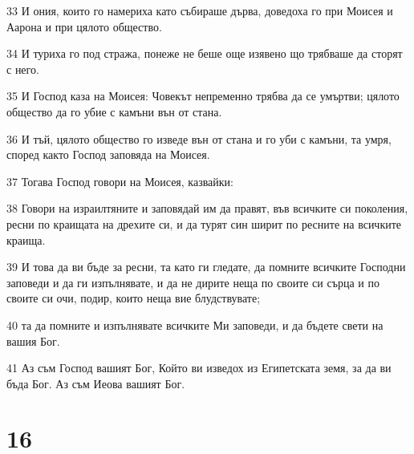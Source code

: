 \par 33 И ония, които го намериха като събираше дърва, доведоха го при Моисея и Аарона и при цялото общество.
\par 34 И туриха го под стража, понеже не беше още изявено що трябваше да сторят с него.
\par 35 И Господ каза на Моисея: Човекът непременно трябва да се умъртви; цялото общество да го убие с камъни вън от стана.
\par 36 И тъй, цялото общество го изведе вън от стана и го уби с камъни, та умря, според както Господ заповяда на Моисея.
\par 37 Тогава Господ говори на Моисея, казвайки:
\par 38 Говори на израилтяните и заповядай им да правят, във всичките си поколения, ресни по краищата на дрехите си, и да турят син ширит по ресните на всичките краища.
\par 39 И това да ви бъде за ресни, та като ги гледате, да помните всичките Господни заповеди и да ги изпълнявате, и да не дирите неща по своите си сърца и по своите си очи, подир, които неща вие блудствувате;
\par 40 та да помните и изпълнявате всичките Ми заповеди, и да бъдете свети на вашия Бог.
\par 41 Аз съм Господ вашият Бог, Който ви изведох из Египетската земя, за да ви бъда Бог. Аз съм Иеова вашият Бог.

\chapter{16}

